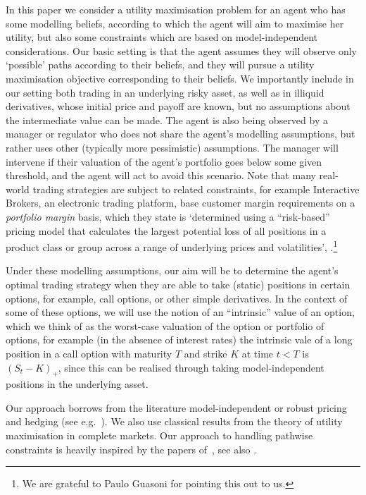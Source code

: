 \documentclass[a4paper]{amsart}
\theoremstyle{definition}
\theoremstyle{remark}
\numberwithin{equation}{section}
\begin{document}
In this paper we  consider a utility maximisation problem for an agent who has some modelling beliefs, according to which the agent will aim to maximise her utility, but also some constraints which are based on model-independent considerations. Our basic setting is that the agent assumes they will observe only `possible' paths according to their beliefs, and they will pursue a utility maximisation objective corresponding to their beliefs. We importantly include in our setting both trading in an underlying risky asset, as well as in illiquid derivatives, whose initial price and payoff are known, but no assumptions about the intermediate value can be made. The agent is also being observed by a manager or regulator who does not share the agent's modelling assumptions, but rather uses other (typically more pessimistic) assumptions. The manager will intervene if their valuation of the agent's portfolio goes below some given threshold, and the agent will act to avoid this scenario. Note that many real-world trading strategies are subject to related constraints, for example Interactive Brokers, an electronic trading platform, base customer margin requirements on a \emph{portfolio margin} basis, which they state is `determined using a ``risk-based'' pricing model that calculates the largest potential loss of all positions in a product class or group across a range of underlying prices and volatilities', \cite{InteractiveBrokers:2025}.\footnote{We are grateful to Paulo Guasoni for pointing this out to us.} 

Under these modelling assumptions, our aim will be to determine the agent's optimal trading strategy when they are able to take (static) positions in certain options, for example, call options, or other simple derivatives. In the context of some of these options, we will use the notion of an ``intrinsic'' value of an option, which we think of as the worst-case valuation of the option or portfolio of options, for example (in the absence of interest rates) the intrinsic vale of a long position in a call option with maturity $T$ and strike $K$ at time $t< T$ is $(S_t-K)_+$, since this can be realised through taking model-independent positions in the underlying asset.

Our approach borrows from the literature model-independent or robust pricing and hedging (see e.g.~\cite{Hobson:1998aa,Cox:2011aa,galichon_stochastic_2014,beiglbock_model-independent_2013,dolinsky_super-replication_2018,Dolinsky:2014aa,beiglbock_pathwise_2017,cheridito_martingale_2021,cox_roots_2013,cox_model-independent_2017}). We also use classical results from the theory of utility maximisation in complete markets. Our approach to handling pathwise constraints is heavily inspired by the papers of~\cite{El-Karoui:2006aa,El-Karoui:2008aa}, see also \cite{bank_stochastic_2021,bank_stochastic_2004}.
\end{document}
